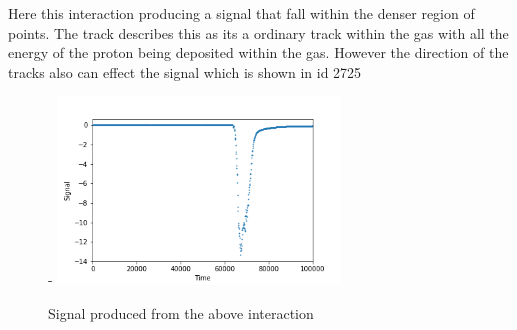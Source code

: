 \documentclass[a4paper]{article}
\begin{document}
\noindent Here this interaction producing a signal that fall within the denser region of points. The track describes this as its a ordinary track within the gas with all the energy of the proton being deposited within the gas. However the direction of the tracks also can effect the signal which is shown in id 2725
\begin{figure}[H]-
        \centering
        \includegraphics[height=5cm]{id 46749/signal_2045.png}
        \caption{Signal produced from the above interaction}
        \label{fig:south2dpp}
        \end{figure}
\end{document}
